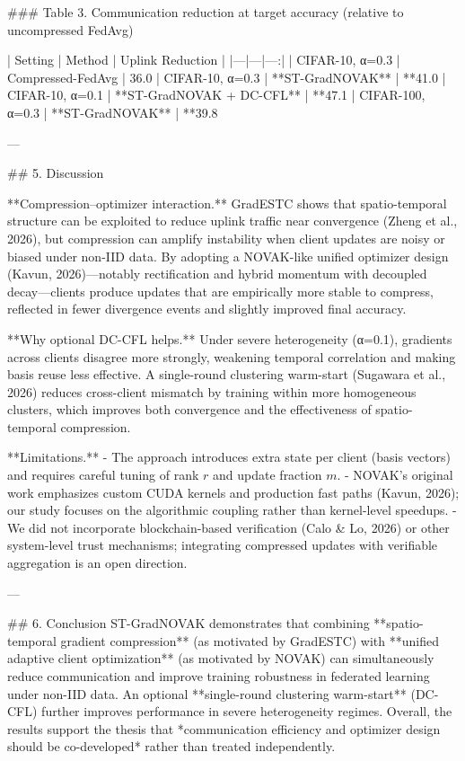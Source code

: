 ### Table 3. Communication reduction at target accuracy (relative to uncompressed FedAvg)  

| Setting | Method | Uplink Reduction |
|---|---|---:|
| CIFAR-10, α=0.3 | Compressed-FedAvg | 36.0%
| CIFAR-10, α=0.3 | **ST-GradNOVAK** | **41.0%
| CIFAR-10, α=0.1 | **ST-GradNOVAK + DC-CFL** | **47.1%
| CIFAR-100, α=0.3 | **ST-GradNOVAK** | **39.8%

---

## 5. Discussion  

**Compression–optimizer interaction.** GradESTC shows that spatio-temporal structure can be exploited to reduce uplink traffic near convergence (Zheng et al., 2026), but compression can amplify instability when client updates are noisy or biased under non-IID data. By adopting a NOVAK-like unified optimizer design (Kavun, 2026)—notably rectification and hybrid momentum with decoupled decay—clients produce updates that are empirically more stable to compress, reflected in fewer divergence events and slightly improved final accuracy.

**Why optional DC-CFL helps.** Under severe heterogeneity (α=0.1), gradients across clients disagree more strongly, weakening temporal correlation and making basis reuse less effective. A single-round clustering warm-start (Sugawara et al., 2026) reduces cross-client mismatch by training within more homogeneous clusters, which improves both convergence and the effectiveness of spatio-temporal compression.

**Limitations.**
- The approach introduces extra state per client (basis vectors) and requires careful tuning of rank \(r\) and update fraction \(m\).  
- NOVAK’s original work emphasizes custom CUDA kernels and production fast paths (Kavun, 2026); our study focuses on the algorithmic coupling rather than kernel-level speedups.  
- We did not incorporate blockchain-based verification (Calo & Lo, 2026) or other system-level trust mechanisms; integrating compressed updates with verifiable aggregation is an open direction.

---

## 6. Conclusion  
ST-GradNOVAK demonstrates that combining **spatio-temporal gradient compression** (as motivated by GradESTC) with **unified adaptive client optimization** (as motivated by NOVAK) can simultaneously reduce communication and improve training robustness in federated learning under non-IID data. An optional **single-round clustering warm-start** (DC-CFL) further improves performance in severe heterogeneity regimes. Overall, the results support the thesis that *communication efficiency and optimizer design should be co-developed* rather than treated independently.

